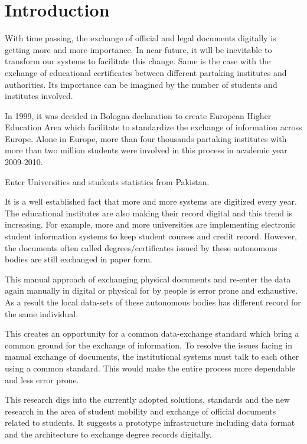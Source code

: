 \documentclass[12pt,a4paper,oneside]{book}
\begin{document}
\listoffigures
\listoftables

\resetpagenumbering

\chapter{Introduction}\label{ch-intro}

With time passing, the exchange of official and legal documents digitally is getting more and more importance. In near future, it will be inevitable to transform our systems to facilitate this change. Same is the case with the exchange of educational certificates between different partaking institutes and authorities. Its importance can be imagined by the number of students and institutes involved. 

In 1999, it was decided in Bologna declaration to create European Higher Education Area which facilitate to standardize the exchange of information across Europe. Alone in Europe, more than four thousands partaking institutes with more than two million students were involved in this process in academic year 2009-2010. 

Enter Universities and students statistics from Pakistan.

It is a well established fact that more and more systems are digitized every year. The educational institutes are also making their record digital and this trend is increasing. For example, more and more universities are implementing electronic student information systems to keep student courses and credit record. However, the documents often called degrees/certificates issued by these autonomous bodies are still exchanged in paper form.  

This manual approach of exchanging physical documents and re-enter the data again manually in digital or physical for by people is error prone and exhaustive. As a result the local data-sets of these autonomous bodies has different record for the same individual. 

This creates an opportunity for a common data-exchange standard which bring a common ground for the exchange of information. To resolve the issues facing in manual exchange of documents, the institutional systems must talk to each other using a common standard. This would make the entire process more dependable and less error prone.

This research digs into the currently adopted solutions, standards and the new research in the area of student mobility and exchange of official documents related to students. It suggests a prototype infrastructure including data format and the architecture to exchange degree records digitally. 
\end{document}
